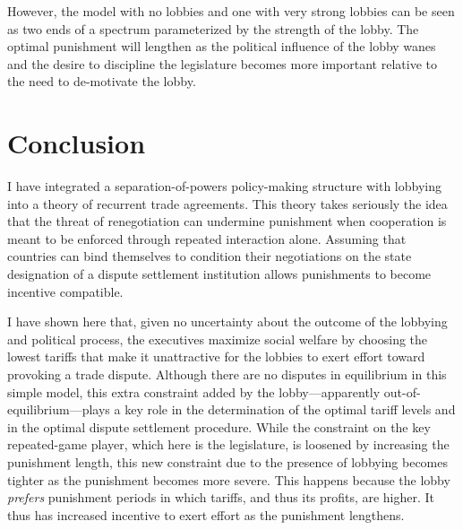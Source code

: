\documentclass[authoryear, review]{elsarticle}
\begin{document}
However, the model with no lobbies and one with very strong lobbies can be seen as two ends of a spectrum parameterized by the strength of the lobby. The optimal punishment will lengthen as the political influence of the lobby wanes and the desire to discipline the legislature becomes more important relative to the need to de-motivate the lobby.









\section{Conclusion}
\label{sec:concl3}
I have integrated a separation-of-powers policy-making structure with lobbying into a theory of recurrent trade agreements. This theory takes seriously the idea that the threat of renegotiation can undermine punishment when cooperation is meant to be enforced through repeated interaction alone. Assuming that countries can bind themselves to condition their negotiations on the state designation of a dispute settlement institution allows punishments to become incentive compatible.

I have shown here that, given no uncertainty about the outcome of the lobbying and political process, the executives maximize social welfare by choosing the lowest tariffs that make it unattractive for the lobbies to exert effort toward provoking a trade dispute. Although there are no disputes in equilibrium in this simple model, this extra constraint added by the lobby---apparently out-of-equilibrium---plays a key role in the determination of the optimal tariff levels and in the optimal dispute settlement procedure. While the constraint on the key repeated-game player, which here is the legislature, is loosened by increasing the punishment length, this new constraint due to the presence of lobbying becomes tighter as the punishment becomes more severe. This happens because the lobby \textit{prefers} punishment periods in which tariffs, and thus its profits, are higher. It thus has increased incentive to exert effort as the punishment lengthens.
\end{document}
